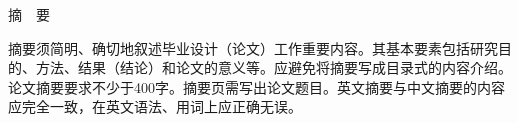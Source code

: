 \clearpage
{}
{}

\begin{center}
  \linespread{1.5}\selectfont
  {\heiti\xiaosan \zjutitlec \par}
  \vspace{1em}
  {\heiti\xiaosan 摘~~要 \par}
\end{center}

\linespread{1.5}\selectfont
\songti\xiaosi

摘要须简明、确切地叙述毕业设计（论文）工作重要内容。其基本要素包括研究目的、方法、结果（结论）和论文的意义等。应避免将摘要写成目录式的内容介绍。论文摘要要求不少于400字。摘要页需写出论文题目。英文摘要与中文摘要的内容应完全一致，在英文语法、用词上应正确无误。

\vspace{2em}

